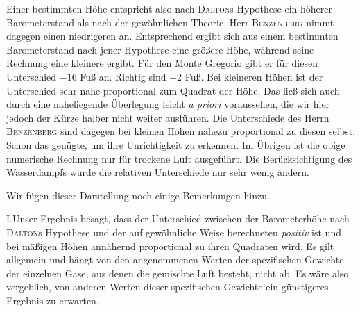 Einer bestimmten Höhe entspricht also nach \textsc{Dalton}s Hypothese ein höherer Barometerstand als nach der gewöhnlichen Theorie. Herr \textsc{Benzenberg} nimmt dagegen einen niedrigeren an. Entsprechend ergibt sich aus einem bestimmten Barometerstand nach jener Hypothese eine größere Höhe, während seine Rechnung eine kleinere ergibt. Für den Monte Gregorio gibt er für diesen Unterschied $-16$ Fuß an. Richtig sind $+2$ Fuß. Bei kleineren Höhen ist der Unterschied sehr nahe proportional zum Quadrat der Höhe. Das ließ sich auch durch eine naheliegende Überlegung leicht \textit{a priori} voraussehen, die wir hier jedoch der Kürze halber nicht weiter ausführen. Die Unterschiede des Herrn \textsc{Benzenberg} sind dagegen bei kleinen Höhen nahezu proportional zu diesen selbst. Schon das genügte, um ihre Unrichtigkeit zu erkennen. Im Übrigen ist die obige numerische Rechnung nur für trockene Luft ausgeführt. Die Berücksichtigung des Wasserdampfs würde die relativen Unterschiede nur sehr wenig ändern.

Wir fügen dieser Darstellung noch einige Bemerkungen hinzu.

I.\quad Unser Ergebnis besagt, dass der Unterschied zwischen der Barometerhöhe nach \textsc{Dalton}s Hypothese und der auf gewöhnliche Weise berechneten \textit{positiv} ist und bei mäßigen Höhen annähernd proportional zu ihren Quadraten wird. Es gilt allgemein und hängt von den angenommenen Werten der spezifischen Gewichte der einzelnen Gase, aus denen die gemischte Luft besteht, nicht ab. Es wäre also vergeblich, von anderen Werten dieser spezifischen Gewichte ein günstigeres Ergebnis zu erwarten.

